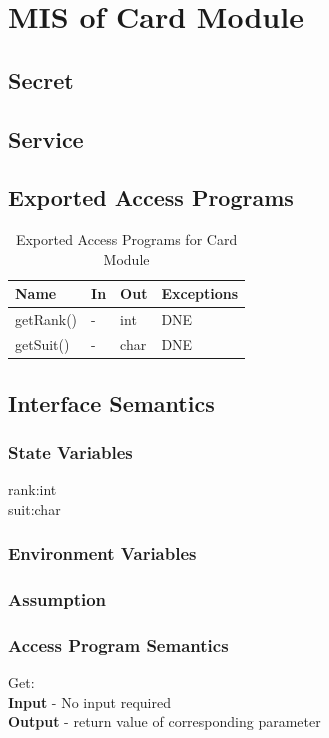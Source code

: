 \documentclass[11pt]{article}
\begin{document}
 	\section{MIS of Card Module}
     \subsection{Secret}
    \subsection{Service}
    \subsection{Exported Access Programs}
    \begin{table}[h]
    \caption{Exported Access Programs for Card Module}
    \begin{tabular}{p{4cm}p{2cm}p{2cm}p{4cm}}
    Name & In & Out & Exceptions\\
    \hline
    getRank() & - & int & DNE\\
    \hline
    getSuit() & - & char & DNE\\
    \hline
    \end{tabular}
    \end{table}
    \subsection{Interface Semantics}
    \subsubsection{State Variables}
    rank:int\\
    suit:char
    \subsubsection{Environment Variables}
    \subsubsection{Assumption}
    \subsubsection{Access Program Semantics}
    Get: \\
    \textbf{Input} - No input required\\
    \textbf{Output} - return value of corresponding parameter\\
 	\newline
\end{document}
